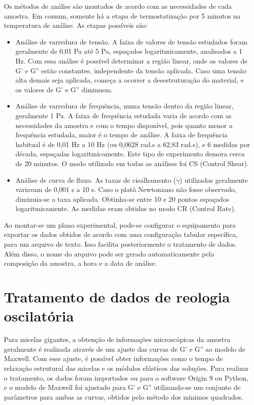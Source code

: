 		Os métodos de análise são montados de acordo com as necessidades de cada amostra. Em comum, somente há a etapa de termostatização por 5 minutos na temperatura de análise. As etapas possíveis são:
		
		\begin{itemize}
			\item Análise de varredura de tensão. A faixa de valores de tensão estudados foram geralmente de 0,01 Pa até 5 Pa, espaçados logaritmicamente, analisados a 1 Hz. Com essa análise é possível determinar a região linear, onde os valores de G' e G'' estão constantes, independente da tensão aplicada. Caso uma tensão alta demais seja aplicada, começa a ocorrer a desestruturação do material, e os valores de G' e G'' diminuem.
			
			\item Análise de varredura de frequência, numa tensão dentro da região linear, geralmente 1 Pa. A faixa de frequência estudada varia de acordo com as necessidades da amostra e com o tempo disponível, pois quanto menor a frequência estudada, maior é o tempo de análise. A faixa de frequência habitual é de 0,01 Hz a 10 Hz (ou 0,0628 rad.s\menosUm{} a 62,83 rad.s\menosUm), e 6 medidas por década, espaçadas logaritmicamente. Este tipo de experimento demora cerca de 20 minutos. O modo utilizado em todas as análises foi CS (Control Shear).
			
			\item Análise de curva de fluxo. As taxas de cisalhamento (\(\dot{\gamma}\)) utilizadas geralmente variavam de 0,001 s\menosUm{} a 10 s\menosUm. Caso o platô Newtoniano não fosse observado, diminuia-se a taxa aplicada. Obtinha-se entre 10 e 20 pontos espaçados logaritmicamente. As medidas eram obtidas no modo CR (Control Rate).
		\end{itemize}
		
		Ao montar-se um plano experimental, pode-se configurar o equipamento para exportar os dados obtidos de acordo com uma configuração tabular específica, para um arquivo de texto. Isso facilita posteriormente o tratamento de dados. Além disso, o nome do arquivo pode ser gerado automaticamente pela composição da amostra, a hora e a data de análise.
		
		\section{Tratamento de dados de reologia oscilatória}
		
		Para micelas gigantes, a obtenção de informações microscópicas da amostra geralmente é realizada através de um ajuste das curvas de G' e G'' ao modelo de Maxwell. Com esse ajuste, é possível obter informações como o tempo de relaxação estrutural das micelas e os módulos elásticos das soluções. Para realizar o tratamento, os dados foram importados ou para o software Origin\textcopyright{} 9 ou Python, e o modelo de Maxwell foi ajustado para G' e G'' utilizando-se um conjunto de parâmetros para ambas as curvas, obtidos pelo método dos mínimos quadrados.
		
